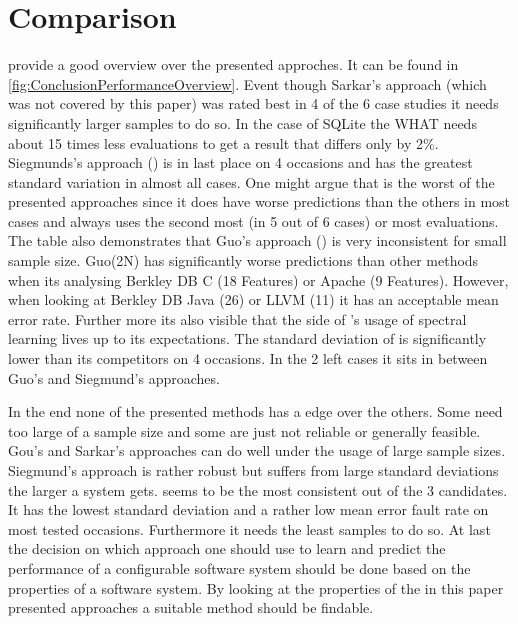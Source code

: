 \section{Comparison}

\citet{FasterDiscoveryofFasterSystemConfigurationsSiegmund2017} provide a good overview over the presented approches. It can be found in \cref{fig:ConclusionPerformanceOverview}. 
Event though Sarkar's approach (which was not covered by this paper) was rated best in 4 of the 6 case studies it needs significantly larger samples to do so. In the case of SQLite the WHAT needs about 15 times less evaluations to get a result that differs only by 2\%.
Siegmunds's approach (\cite{AutomatedFeatureDetectionSiegmund2012}) is in last place on 4 occasions and has the greatest standard variation in almost all cases. One might argue that \AFID is the worst of the presented approaches since it does have worse predictions than the others in most cases and always uses the second most (in 5 out of 6 cases) or most evaluations.
The table also demonstrates that Guo's approach (\cite{VariabilityAwarePerformancePredictionJianmeiSigmundApel}) is very inconsistent for small sample size. Guo(2N) has significantly worse predictions than other methods when its analysing Berkley DB C (18 Features) or Apache (9 Features). However, when looking at Berkley DB Java (26) or LLVM (11) it has an acceptable mean error rate.
Further more its also visible that the side of \WHAT's usage of spectral learning lives up to its expectations. The standard deviation of \WHAT is significantly lower than its competitors on 4 occasions. In the 2 left cases it sits in between Guo's and Siegmund's approaches.

In the end none of the presented methods has a edge over the others. Some need too large of a sample size and some are just not reliable or generally feasible. Gou's and Sarkar's approaches can do well under the usage of large sample sizes. Siegmund's approach is rather robust but suffers from large standard deviations the larger a system gets. \WHAT seems to be the most consistent out of the 3 candidates. It has the lowest standard deviation and a rather low mean error fault rate on most tested occasions. Furthermore it needs the least samples to do so.
At last the decision on which approach one should use to learn and predict the performance of a configurable software system should be done based on the properties of a software system. By looking at the properties of the in this paper presented approaches a suitable method should be findable.

\FloatBarrier